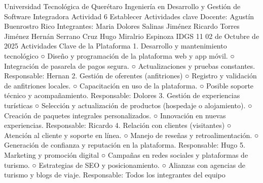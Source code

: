 Universidad Tecnológica de Querétaro
Ingeniería en Desarrollo y Gestión de Software
Integradora
Actividad 6 Establecer Actividades clave
Docente:
Agustín Buenrostro Rico
Integrantes:
Maria Dolores Salinas Jiménez
Ricardo Torres Jiménez
Hernán Serrano Cruz
Hugo Miralrio Espinoza
IDGS 11
02 de Octubre de 2025
Actividades Clave de la Plataforma
1. Desarrollo y mantenimiento tecnológico
○ Diseño y programación de la plataforma web y app móvil.
○ Integración de pasarela de pagos segura.
○ Actualizaciones y pruebas constantes.
Responsable: Hernan
2. Gestión de oferentes (anfitriones)
○ Registro y validación de anfitriones locales.
○ Capacitación en uso de la plataforma.
○ Posible soporte técnico y acompañamiento.
Responsable: Dolores
3. Gestión de experiencias turísticas
○ Selección y actualización de productos (hospedaje o alojamiento).
○ Creación de paquetes integrales personalizados.
○ Innovación en nuevas experiencias.
Responsable: Ricardo
4. Relación con clientes (visitantes)
○ Atención al cliente y soporte en línea.
○ Manejo de reseñas y retroalimentación.
○ Generación de confianza y reputación en la plataforma.
Responsable: Hugo
5. Marketing y promoción digital
○ Campañas en redes sociales y plataformas de turismo.
○ Estrategias de SEO y posicionamiento.
○ Alianzas con agencias de turismo y blogs de viaje.
Responsable: Todos los integrantes del equipo